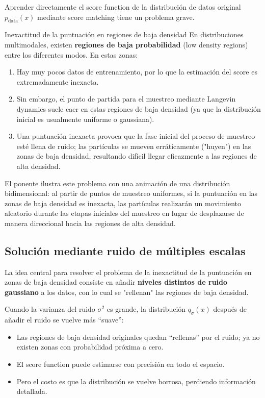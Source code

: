 \documentclass[a4paper]{article}
\begin{document}
Aprender directamente el score function de la distribución de datos original $p_{\text{data}}(x)$ mediante score matching tiene un problema grave.

\begin{warningbox}{Inexactitud de la puntuación en regiones de baja densidad}
En distribuciones multimodales, existen \textbf{regiones de baja probabilidad} (low density regions) entre los diferentes modos. En estas zonas:
\begin{enumerate}
    \item Hay muy pocos datos de entrenamiento, por lo que la estimación del score es extremadamente inexacta.
    \item Sin embargo, el punto de partida para el muestreo mediante Langevin dynamics suele caer en estas regiones de baja densidad (ya que la distribución inicial es usualmente uniforme o gaussiana).
    \item Una puntuación inexacta provoca que la fase inicial del proceso de muestreo esté llena de ruido; las partículas se mueven erráticamente ("huyen") en las zonas de baja densidad, resultando difícil llegar eficazmente a las regiones de alta densidad.
\end{enumerate}
\end{warningbox}

El ponente ilustra este problema con una animación de una distribución bidimensional: al partir de puntos de muestreo uniformes, si la puntuación en las zonas de baja densidad es inexacta, las partículas realizarán un movimiento aleatorio durante las etapas iniciales del muestreo en lugar de desplazarse de manera direccional hacia las regiones de alta densidad.

\subsection{Solución mediante ruido de múltiples escalas}

La idea central para resolver el problema de la inexactitud de la puntuación en zonas de baja densidad consiste en añadir \textbf{niveles distintos de ruido gaussiano} a los datos, con lo cual se "rellenan" las regiones de baja densidad.

Cuando la varianza del ruido $\sigma^2$ es grande, la distribución $q_\sigma(x)$ después de añadir el ruido se vuelve más ``suave'':
\begin{itemize}
    \item Las regiones de baja densidad originales quedan ``rellenas'' por el ruido; ya no existen zonas con probabilidad próxima a cero.
    \item El score function puede estimarse con precisión en todo el espacio.
    \item Pero el costo es que la distribución se vuelve borrosa, perdiendo información detallada.
\end{itemize}
\end{document}
